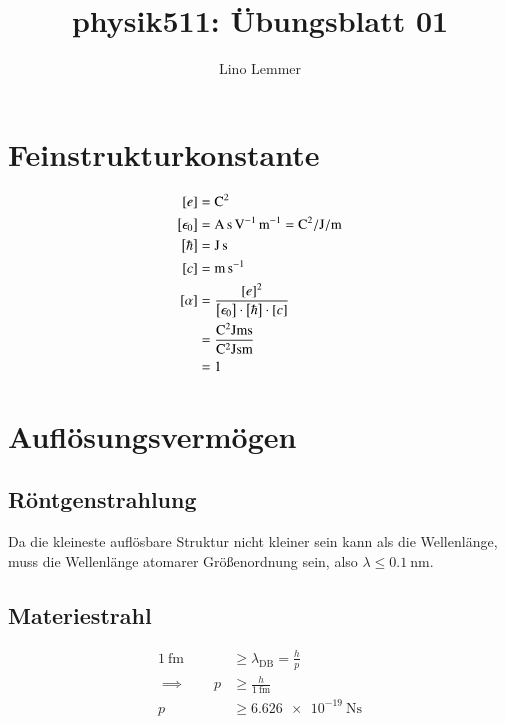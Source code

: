

\renewcommand\thesection{Übung \arabic{section}:}
\renewcommand\thesubsection{\arabic{section}.\arabic{subsection}:}

\title{physik511: Übungsblatt 01}
\author{Lino Lemmer}


\maketitle
\section{Feinstrukturkonstante}

\begin{align*}
    \sbr{e} &= \si{\coulomb^2} \\
    \sbr{\epsilon_0} &= \si{\ampere\second\per\volt\per\meter} = \si{\coulomb^2 \per\joule \per\meter} \\
    \sbr{\hbar} &= \si{\joule\second} \\
    \sbr{c} &= \si{\meter\per\second} \\
    \sbr\alpha &= \frac {\sbr{e}^2} {\sbr{\epsilon_0} \cdot \sbr{\hbar} \cdot \sbr{c}} \\
               &= \frac {\si{\coulomb^2 \joule \meter \second}}{\si{\coulomb^2 \joule \second \meter}} \\
               &= 1
\end{align*}

\section{Auflösungsvermögen}

\subsection{Röntgenstrahlung}

Da die kleineste auflösbare Struktur nicht kleiner sein kann als die Wellenlänge, muss die Wellenlänge atomarer Größenordnung sein, also $\lambda \le \SI{0.1}{\nano\meter}$.

\subsection{Materiestrahl}

\begin{align*}
    \SI{1}{\femto\meter} &\ge \lambda_\text{DB} = \frac hp \\
    \implies \qquad p &\ge \frac h{\SI{1}{\femto\meter}} \\
    p &\ge \SI{6.626e-19}{\newton\second}
\end{align*}

